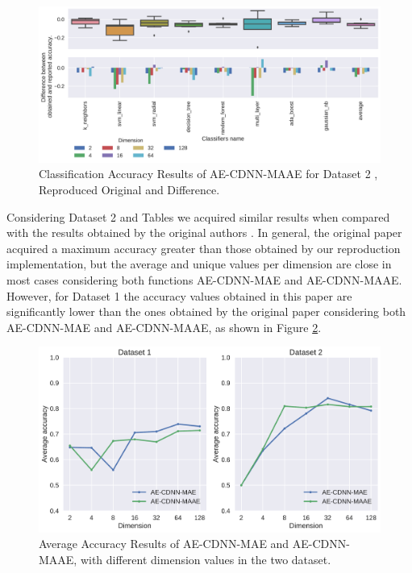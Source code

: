 \begin{figure}[!ht]
    \centering
    \includegraphics[width=\linewidth]{figure/table_5.pdf}
    \caption{Classification Accuracy Results of AE-CDNN-MAAE for Dataset 2 \cite{WenZha:2018}, Reproduced Original and Difference.}
\label{fig:acc-AE-CDNN-MAAE-d2}
\end{figure}


\newpage

Considering Dataset 2 and Tables we acquired similar results when compared with the results obtained by the original authors \cite{WenZha:2018}. In general, the original paper acquired a maximum accuracy greater than those obtained by our reproduction implementation, but the average and unique values per dimension are close in most cases considering both functions AE-CDNN-MAE and AE-CDNN-MAAE. However, for Dataset 1 the accuracy values obtained in this paper are significantly lower than the ones obtained by the original paper considering both AE-CDNN-MAE and AE-CDNN-MAAE, as shown in Figure \ref{fig:average}. 

\newpage


\begin{figure}[!ht]
\centering
\includegraphics[width=0.8\linewidth]{figure/average.pdf}
    \caption{Average Accuracy Results of AE-CDNN-MAE and AE-CDNN-MAAE, with different dimension values in the two dataset.}
\label{fig:average}
\end{figure}

